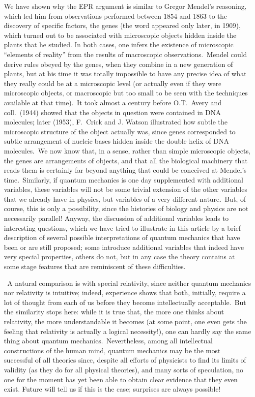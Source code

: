\documentclass[12pt,onecolumn]{article}%
\begin{document}
We have shown why the EPR argument is similar to Gregor Mendel's reasoning,
which led him from observations performed between 1854 and 1863 to the
discovery of specific factors, the genes (the word appeared only later, in
1909), which turned out to be associated with microscopic objects hidden
inside the plants that he studied. In both cases, one infers the existence of
microscopic ``elements of reality'' from the results of macroscopic
observations.\ Mendel could derive rules obeyed by the genes, when they
combine in a new generation of plants, but at his time it was totally
impossible to have any precise idea of what they really could be at a
microscopic level (or actually even if they were microscopic objects, or
macroscopic but too small to be seen with the techniques available at that
time).\ It took almost a century before O.T.\ Avery and coll.\ (1944) showed
that the objects in question were contained in DNA molecules; later (1953),
F.\ Crick and J. Watson illustrated how subtle the microscopic structure of
the object actually was, since genes corresponded to subtle arrangement of
nucleic bases hidden inside the double helix of DNA molecules.\ We now know
that, in a sense, rather than simple microscopic objects, the genes are
arrangements of objects, and that all the biological machinery that reads them
is certainly far beyond anything that could be conceived at Mendel's
time.\ Similarly, if quantum mechanics is one day supplemented with additional
variables, these variables will not be some trivial extension of the other
variables that we already have in physics, but variables of a very different
nature.\ But, of course, this is only a possibility, since the histories of
biology and physics are not necessarily parallel! Anyway, the discussion of
additional variables leads to interesting questions, which we have tried to
illustrate in this article by a brief description of several possible
interpretations of quantum mechanics that have been or are still proposed;
some introduce additional variables that indeed have very special properties,
others do not, but in any case the theory contains at some stage features that
are reminiscent of these difficulties.

\ A natural comparison is with special relativity, since neither quantum
mechanics nor relativity is intuitive; indeed, experience shows that both,
initially, require a lot of thought from each of us before they become
intellectually acceptable.\ But the similarity stops here: while it is true
that, the more one thinks about relativity, the more understandable it becomes
(at some point, one even gets the feeling that relativity is actually a
logical necessity!), one can hardly say the same thing about quantum
mechanics.\ Nevertheless, among all intellectual constructions of the human
mind, quantum mechanics may be the most successful of all theories since,
despite all efforts of physicists to find its limits of validity (as they do
for all physical theories), and many sorts of speculation, no one for the
moment has yet been able to obtain clear evidence that they even exist. Future
will tell us if this is the case; surprises are always possible!
\end{document}

